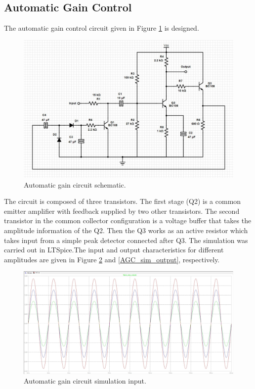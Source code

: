 \documentclass[a4paper,10pt]{IEEEtran}
\begin{document}
\subsection{Automatic Gain Control}
The automatic gain control circuit given in Figure \ref{AGC} is designed.

\begin{figure}[H]
    \centering
    \includegraphics[width = 1\linewidth]{AGC Circuit.jpg}
    \caption{Automatic gain circuit schematic.}
    \label{AGC}
\end{figure} 
 The circuit is composed of three transistors. The first stage (Q2) is a common emitter amplifier with feedback supplied by two other transistors. The second transistor in the common collector configuration is a voltage buffer that takes the amplitude information of the Q2. Then the Q3 works as an active resistor which takes input from a simple peak detector connected after Q3. 
 The simulation was carried out in LTSpice.The input and output characteristics for different amplitudes are given in Figure \ref{AGC_sim_input} and \ref{AGC_sim_output}, respectively.
 \begin{figure}[htbp!]
    \centering
    \includegraphics[width = 1\linewidth]{AGC Simulation Input.jpg}
    \caption{Automatic gain circuit simulation input.}
    \label{AGC_sim_input}
\end{figure} 
\end{document}
